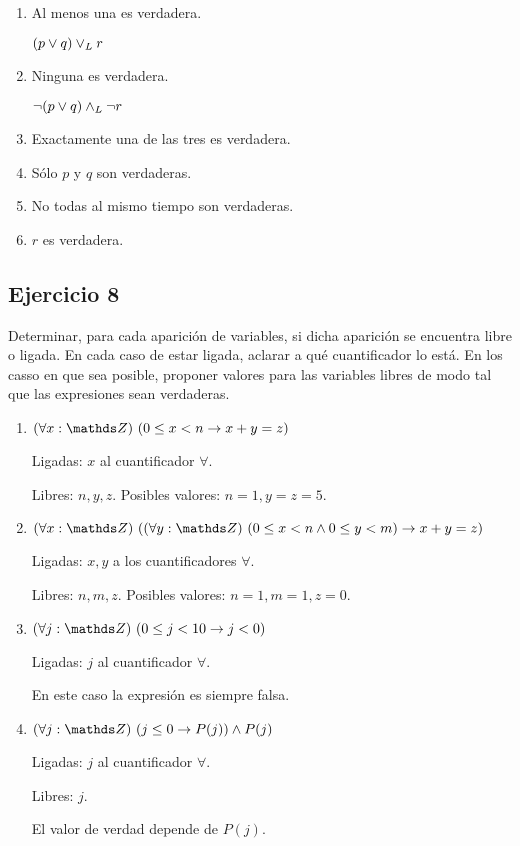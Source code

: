 \begin{enumerate}[label=\alph*)]
      \item Al menos una es verdadera.

            $(p \lor q) \lor _L r$

      \item Ninguna es verdadera.

            $\neg (p \lor q) \land _L \neg r$

      \item Exactamente una de las tres es verdadera. \hacer

      \item Sólo $p$ y $q$ son verdaderas. \hacer

      \item No todas al mismo tiempo son verdaderas. \hacer

      \item $r$ es verdadera. \hacer
\end{enumerate}

\subsection{Ejercicio 8}
Determinar, para cada aparición de variables, si dicha aparición se encuentra libre o ligada. En cada caso de estar ligada, aclarar a qué cuantificador lo está. En los casso en que sea posible, proponer valores para las variables libres de modo tal que las expresiones sean verdaderas.

\begin{enumerate}[label=\alph*)]
      \item $\paraTodo{x}{\ent}{0 \leq x < n \Then x + y = z}$

            Ligadas: $x$ al cuantificador $\forall$.

            Libres: $n, y, z$. Posibles valores: $n = 1, y = z = 5$.

      \item $\paraTodo{x}{\ent}{\paraTodo{y}{\ent}{0 \leq x < n \land 0 \leq y < m} \Then x + y = z}$

            Ligadas: $x, y$ a los cuantificadores $\forall$.

            Libres: $n, m, z$. Posibles valores: $n = 1, m = 1, z = 0$.

      \item $\paraTodo{j}{\ent}{0 \leq j < 10 \Then j < 0}$

            Ligadas: $j$ al cuantificador $\forall$.

            En este caso la expresión es siempre falsa.

      \item $\paraTodo{j}{\ent}{j \leq 0 \Then P(j)} \land P(j)$

            Ligadas: $j$ al cuantificador $\forall$.

            Libres: $j$.

            El valor de verdad depende de $P(j)$.
\end{enumerate}

